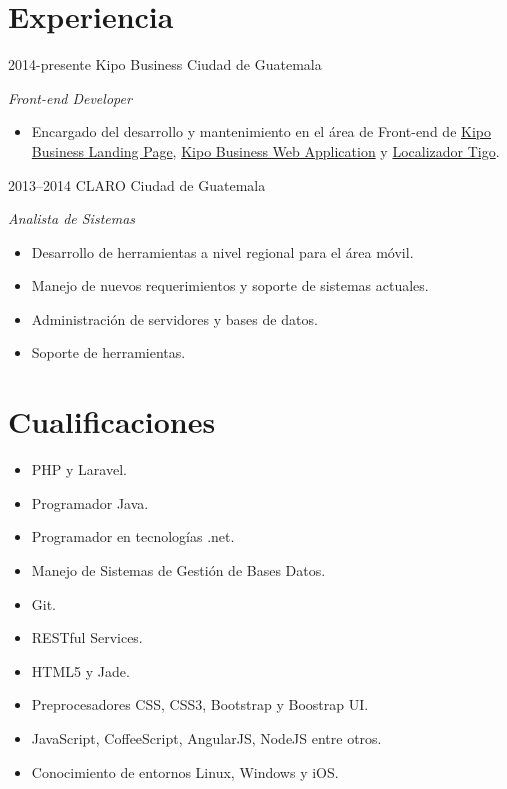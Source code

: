 \documentclass[]{friggeri-cv} %
\begin{document}
\section{Experiencia}
\begin{entrylist}
\entry
	{2014-presente}
	{Kipo Business}
	{Ciudad de Guatemala}
	{\emph{Front-end Developer} \\
	
	\begin{itemize}
		\item Encargado del desarrollo y mantenimiento en el área de Front-end de \href{https://kipobusiness.com/}{Kipo Business Landing Page}, \href{https://app.kipobusiness.com/}{Kipo Business Web Application} y \href{http://localizador.tigo.com.gt/}{Localizador Tigo}.
	\end{itemize}
	
	}
	
\entry
	{2013--2014}
	{CLARO}
	{Ciudad de Guatemala}
	{\emph{Analista de Sistemas} \\
	
	\begin{itemize}
		\item Desarrollo de herramientas a nivel regional para el área móvil. 
		\item Manejo de nuevos requerimientos y soporte de sistemas actuales.
		\item Administración de servidores y bases de datos.
		\item Soporte de herramientas.
	\end{itemize}
	
	}



\end{entrylist}


\section{Cualificaciones}
\begin{itemize}
	\item PHP y Laravel.
	\item Programador Java.
	\item Programador en tecnologías .net.
	\item Manejo de Sistemas de Gestión de Bases Datos.
	\item Git.
	\item RESTful Services.
	\item HTML5 y Jade.
	\item Preprocesadores CSS, CSS3, Bootstrap y Boostrap UI.
	\item JavaScript, CoffeeScript, AngularJS, NodeJS entre otros.
	\item Conocimiento de entornos Linux, Windows y iOS.

\end{itemize}
\end{document}
